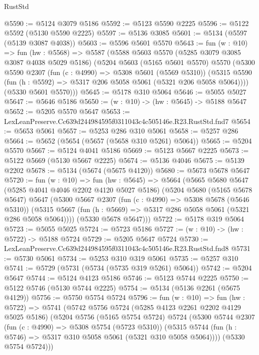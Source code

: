 \begin{lexlean}{RustStd}
\begin{coremodule}
@5590 := @5124 @3079 @5186
@5592 := @5123 @5590 @2225
@5596 := @5122 @5592 (@5130 @5590 @2225)
@5597 := @5136 @3085
@5601 := @5134 (@5597 (@5139 @3087 @4038))
@5603 := @5596 @5601 @5570
@5643 := fun (w : @10) =>
  fun (hw : @5568) =>
  @5587
    (@5588
      @5603
      @5570
      (@5285 @3079 @3085 @3087 @4038 @5029 @5186)
      (@5204
        @5603
        (@5165 @5601 @5570)
        @5570
        (@5300
          @5590
          @2307
          (fun (c : @4990) => @5308 @5601 (@5569 @5310))
          (@5315 @5590 (fun (h : @5592) => @5317 @206 @5058 @5061 (@5321 @206 @5058 @5064))))
        (@5330 @5601 @5570)))
@5645 := @5178 @310 @5064
@5646 := @5055 @5027
@5647 := @5646 @5186
@5650 := (w : @10) -> (hw : @5645) -> @5188 @5647
@5652 := @5205 @5570 @5647
@5653 := LexLeanPreserve.Cc639d244984595f0311043c4c505146e.R23.RustStd.fnd7
@5654 := @5653 @5061
@5657 := @5253 @286 @310 @5061
@5658 := @5257 @286
@5664 := @5652 (@5654 (@5657 (@5658 @310 @5261) @5064))
@5665 := @5204 @5570
@5667 := @5124 @4041 @5186
@5669 := @5123 @5667 @2225
@5673 := @5122 @5669 (@5130 @5667 @2225)
@5674 := @5136 @4046
@5675 := @5139 @2202
@5678 := @5134 (@5674 (@5675 @4120))
@5680 := @5673 @5678 @5647
@5720 := fun (w : @10) =>
  fun (hw : @5645) =>
  @5664
    (@5665
      @5680
      @5647
      (@5285 @4041 @4046 @2202 @4120 @5027 @5186)
      (@5204
        @5680
        (@5165 @5678 @5647)
        @5647
        (@5300
          @5667
          @2307
          (fun (c : @4990) => @5308 @5678 (@5646 @5310))
          (@5315 @5667 (fun (h : @5669) => @5317 @286 @5058 @5061 (@5321 @286 @5058 @5064))))
        (@5330 @5678 @5647)))
@5722 := @5178 @319 @5064
@5723 := @5055 @5025
@5724 := @5723 @5186
@5727 := (w : @10) -> (hw : @5722) -> @5188 @5724
@5729 := @5205 @5647 @5724
@5730 := LexLeanPreserve.Cc639d244984595f0311043c4c505146e.R23.RustStd.fnd8
@5731 := @5730 @5061
@5734 := @5253 @310 @319 @5061
@5735 := @5257 @310
@5741 := @5729 (@5731 (@5734 (@5735 @319 @5261) @5064))
@5742 := @5204 @5647
@5744 := @5124 @4123 @5186
@5746 := @5123 @5744 @2225
@5750 := @5122 @5746 (@5130 @5744 @2225)
@5754 := @5134 (@5136 @2261 (@5675 @4129))
@5756 := @5750 @5754 @5724
@5796 := fun (w : @10) =>
  fun (hw : @5722) =>
  @5741
    (@5742
      @5756
      @5724
      (@5285 @4123 @2261 @2202 @4129 @5025 @5186)
      (@5204
        @5756
        (@5165 @5754 @5724)
        @5724
        (@5300
          @5744
          @2307
          (fun (c : @4990) => @5308 @5754 (@5723 @5310))
          (@5315 @5744 (fun (h : @5746) => @5317 @310 @5058 @5061 (@5321 @310 @5058 @5064))))
        (@5330 @5754 @5724)))

\end{coremodule}
\end{lexlean}

